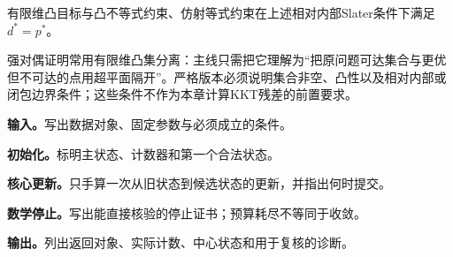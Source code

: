 \begin{theorem}[凸问题的强对偶]
有限维凸目标与凸不等式约束、仿射等式约束在上述相对内部Slater条件下满足 $d^*=p^*$。
\end{theorem}

\begin{keypointbox}[title=扩展讨论：分离定理在这里做什么]
强对偶证明常用有限维凸集分离：主线只需把它理解为“把原问题可达集合与更优但不可达的点用超平面隔开”。严格版本必须说明集合非空、凸性以及相对内部或闭包边界条件；这些条件不作为本章计算KKT残差的前置要求。
\end{keypointbox}

\label{struct:V1-C07-CH11}

\begin{keypointbox}[title={候选原--对偶解的KKT残差检验：五步阅读}]
\textbf{输入。}写出数据对象、固定参数与必须成立的条件。\par
\textbf{初始化。}标明主状态、计数器和第一个合法状态。\par
\textbf{核心更新。}只手算一次从旧状态到候选状态的更新，并指出何时提交。\par
\textbf{数学停止。}写出能直接核验的停止证书；预算耗尽不等同于收敛。\par
\textbf{输出。}列出返回对象、实际计数、中心状态和用于复核的诊断。
\end{keypointbox}

